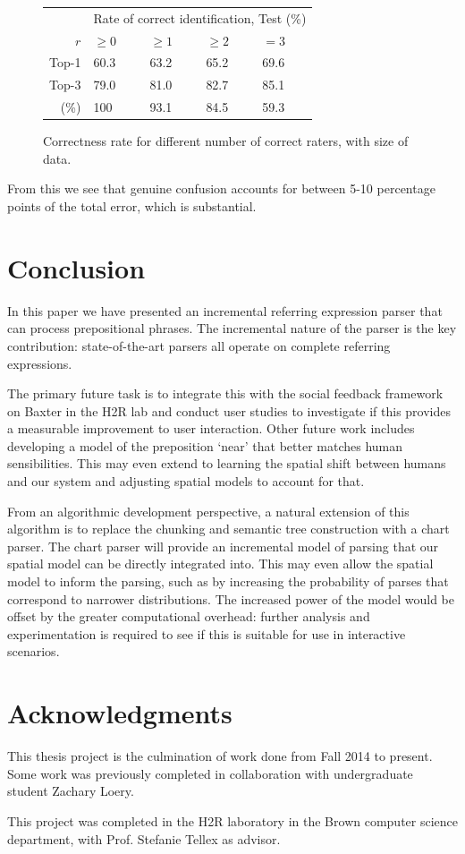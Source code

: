 \documentclass[conference]{IEEEtran}
\numberwithin{equation}{section}
\begin{document}
\begin{figure}[h!tb]
  \centering
  \begin{tabular}{|r|m{1.2cm}m{1.2cm}m{1.2cm}m{1.2cm}|}\hline
  & \multicolumn{4}{c|}{Rate of correct identification, Test (\%)} \\
  $r$ & $\geq 0$ & $\geq 1$ & $\geq 2$ & $=3$ \\\hline
  Top-1 & 60.3 & 63.2 & 65.2 & 69.6 \\
  Top-3 & 79.0 & 81.0 & 82.7 & 85.1 \\\hline
  (\%) & 100 & 93.1 & 84.5 & 59.3 \\\hline
  \end{tabular}
  \caption{Correctness rate for different number of correct raters, with size of data.}
  \label{fig:interrater}
\end{figure}

From this we see that genuine confusion accounts for between 5-10 percentage points of the total error, which is substantial.

\section{Conclusion}
In this paper we have presented an incremental referring expression parser that can process prepositional phrases. The incremental nature of the parser is the key contribution: state-of-the-art parsers all operate on complete referring expressions. 

The primary future task is to integrate this with the social feedback framework on Baxter in the H2R lab and conduct user studies to investigate if this provides a measurable improvement to user interaction. Other future work includes developing a model of the preposition `near' that better matches human sensibilities. This may even extend to learning the spatial shift between humans and our system and adjusting spatial models to account for that.

From an algorithmic development perspective, a natural extension of this algorithm is to replace the chunking and semantic tree construction with a chart parser. The chart parser will provide an incremental model of parsing that our spatial model can be directly integrated into. This may even allow the spatial model to inform the parsing, such as by increasing the probability of parses that correspond to narrower distributions. The increased power of the model would be offset by the greater computational overhead: further analysis and experimentation is required to see if this is suitable for use in interactive scenarios.

\section{Acknowledgments}
This thesis project is the culmination of work done from Fall 2014 to present. Some work was previously completed in collaboration with undergraduate student Zachary Loery.

This project was completed in the H2R laboratory in the Brown computer science department, with Prof. Stefanie Tellex as advisor.

\printbibliography
\end{document}

